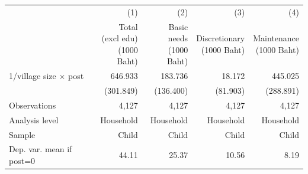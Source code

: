 \begin{center} \begin{threeparttable} \begin{tabular}{l*{4}{r}} \hline \hline 
                    &         (1)&         (2)&         (3)&         (4)\\
                    &\shortstack{Total\\(excl edu)\\(1000 Baht)}&\shortstack{Basic needs\\(1000 Baht)}&\shortstack{Discretionary\\(1000 Baht)}&\shortstack{Maintenance\\(1000 Baht)}\\
\hline
1/village size $\times$ post&     646.933&     183.736&      18.172&     445.025\\
                    &   (301.849)&   (136.400)&    (81.903)&   (288.891)\\
\hline
Observations        &       4,127&       4,127&       4,127&       4,127\\
Analysis level      &   Household&   Household&   Household&   Household\\
Sample              &       Child&       Child&       Child&       Child\\
Dep. var. mean if post=0&       44.11&       25.37&       10.56&        8.19\\
\hline \end{tabular} \end{threeparttable} \end{center}
